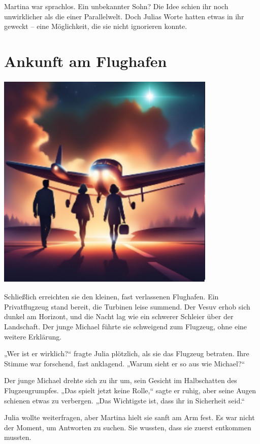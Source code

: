 \documentclass[
]{article}
\begin{document}
Martina war sprachlos. Ein unbekannter Sohn? Die Idee schien ihr noch
unwirklicher als die einer Parallelwelt. Doch Julias Worte hatten etwas
in ihr geweckt -- eine Möglichkeit, die sie nicht ignorieren konnte.

\section{Ankunft am Flughafen}\label{ankunft-am-flughafen}

\includegraphics[width=4.1232in,height=4.14371in]{media/image7.png}

Schließlich erreichten sie den kleinen, fast verlassenen Flughafen. Ein
Privatflugzeug stand bereit, die Turbinen leise summend. Der Vesuv erhob
sich dunkel am Horizont, und die Nacht lag wie ein schwerer Schleier
über der Landschaft. Der junge Michael führte sie schweigend zum
Flugzeug, ohne eine weitere Erklärung.

„Wer ist er wirklich?{\kern0pt}`` fragte Julia plötzlich, als sie das
Flugzeug betraten. Ihre Stimme war forschend, fast anklagend. „Warum
sieht er so aus wie Michael?{\kern0pt}``

Der junge Michael drehte sich zu ihr um, sein Gesicht im Halbschatten
des Flugzeugrumpfes. „Das spielt jetzt keine Rolle,`` sagte er ruhig,
aber seine Augen schienen etwas zu verbergen. „Das Wichtigste ist, dass
ihr in Sicherheit seid.``

Julia wollte weiterfragen, aber Martina hielt sie sanft am Arm fest. Es
war nicht der Moment, um Antworten zu suchen. Sie wussten, dass sie
zuerst entkommen mussten.
\end{document}
